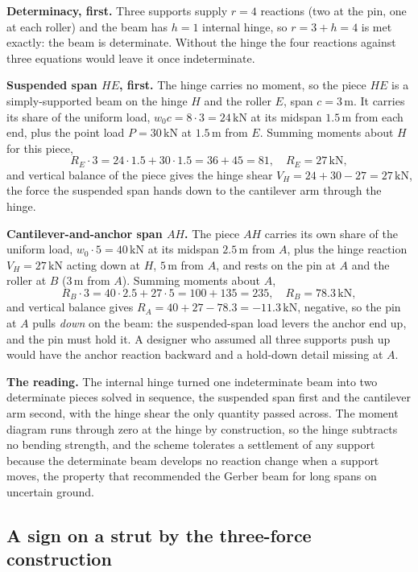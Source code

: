 \textbf{Determinacy, first.} Three supports supply $r = 4$ reactions (two at the
pin, one at each roller) and the beam has $h = 1$ internal hinge, so
$r = 3 + h = 4$ is met exactly: the beam is determinate. Without the hinge the
four reactions against three equations would leave it once indeterminate.

\textbf{Suspended span $HE$, first.} The hinge carries no moment, so the piece
$HE$ is a simply-supported beam on the hinge $H$ and the roller $E$, span
$c = 3\,\si{\meter}$. It carries its share of the uniform load,
$w_0 c = 8 \cdot 3 = 24\,\text{kN}$ at its midspan $1.5\,\si{\meter}$ from each
end, plus the point load $P = 30\,\text{kN}$ at $1.5\,\si{\meter}$ from $E$.
Summing moments about $H$ for this piece,
\[
R_E \cdot 3 = 24 \cdot 1.5 + 30 \cdot 1.5 = 36 + 45 = 81, \quad
R_E = 27\,\text{kN},
\]
and vertical balance of the piece gives the hinge shear
$V_H = 24 + 30 - 27 = 27\,\text{kN}$, the force the suspended span hands down to
the cantilever arm through the hinge.

\textbf{Cantilever-and-anchor span $AH$.} The piece $AH$ carries its own share
of the uniform load, $w_0 \cdot 5 = 40\,\text{kN}$ at its midspan
$2.5\,\si{\meter}$ from $A$, plus the hinge reaction $V_H = 27\,\text{kN}$ acting
down at $H$, $5\,\si{\meter}$ from $A$, and rests on the pin at $A$ and the
roller at $B$ ($3\,\si{\meter}$ from $A$). Summing moments about $A$,
\[
R_B \cdot 3 = 40 \cdot 2.5 + 27 \cdot 5 = 100 + 135 = 235, \quad
R_B = 78.3\,\text{kN},
\]
and vertical balance gives $R_A = 40 + 27 - 78.3 = -11.3\,\text{kN}$, negative,
so the pin at $A$ pulls \emph{down} on the beam: the suspended-span load levers
the anchor end up, and the pin must hold it. A designer who assumed all three
supports push up would have the anchor reaction backward and a hold-down detail
missing at $A$.

\textbf{The reading.} The internal hinge turned one indeterminate beam into two
determinate pieces solved in sequence, the suspended span first and the
cantilever arm second, with the hinge shear the only quantity passed across. The
moment diagram runs through zero at the hinge by construction, so the hinge
subtracts no bending strength, and the scheme tolerates a settlement of any
support because the determinate beam develops no reaction change when a support
moves, the property that recommended the Gerber beam for long spans on
uncertain ground.

\subsection{A sign on a strut by the three-force construction}

